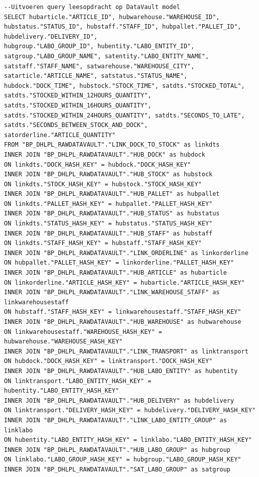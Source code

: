 \begin{lstlisting}[frame=single]
--Uitvoeren query leesopdracht op DataVault model
SELECT hubarticle."ARTICLE_ID", hubwarehouse."WAREHOUSE_ID", hubstatus."STATUS_ID", hubstaff."STAFF_ID", hubpallet."PALLET_ID", hubdelivery."DELIVERY_ID",
hubgroup."LABO_GROUP_ID", hubentity."LABO_ENTITY_ID", satgroup."LABO_GROUP_NAME", satentity."LABO_ENTITY_NAME", satstaff."STAFF_NAME", satwarehouse."WAREHOUSE_CITY",
satarticle."ARTICLE_NAME", satstatus."STATUS_NAME", hubdock."DOCK_TIME", hubstock."STOCK_TIME", satdts."STOCKED_TOTAL", satdts."STOCKED_WITHIN_12HOURS_QUANTITY",
satdts."STOCKED_WITHIN_16HOURS_QUANTITY", satdts."STOCKED_WITHIN_24HOURS_QUANTITY", satdts."SECONDS_TO_LATE", satdts."SECONDS_BETWEEN_STOCK_AND_DOCK", satorderline."ARTICLE_QUANTITY"
FROM "BP_DHLPL_RAWDATAVAULT"."LINK_DOCK_TO_STOCK" as linkdts
INNER JOIN "BP_DHLPL_RAWDATAVAULT"."HUB_DOCK" as hubdock
ON linkdts."DOCK_HASH_KEY" = hubdock."DOCK_HASH_KEY"
INNER JOIN "BP_DHLPL_RAWDATAVAULT"."HUB_STOCK" as hubstock
ON linkdts."STOCK_HASH_KEY" = hubstock."STOCK_HASH_KEY"
INNER JOIN "BP_DHLPL_RAWDATAVAULT"."HUB_PALLET" as hubpallet
ON linkdts."PALLET_HASH_KEY" = hubpallet."PALLET_HASH_KEY"
INNER JOIN "BP_DHLPL_RAWDATAVAULT"."HUB_STATUS" as hubstatus
ON linkdts."STATUS_HASH_KEY" = hubstatus."STATUS_HASH_KEY"
INNER JOIN "BP_DHLPL_RAWDATAVAULT"."HUB_STAFF" as hubstaff
ON linkdts."STAFF_HASH_KEY" = hubstaff."STAFF_HASH_KEY"
INNER JOIN "BP_DHLPL_RAWDATAVAULT"."LINK_ORDERLINE" as linkorderline
ON hubpallet."PALLET_HASH_KEY" = linkorderline."PALLET_HASH_KEY"
INNER JOIN "BP_DHLPL_RAWDATAVAULT"."HUB_ARTICLE" as hubarticle
ON linkorderline."ARTICLE_HASH_KEY" = hubarticle."ARTICLE_HASH_KEY"
INNER JOIN "BP_DHLPL_RAWDATAVAULT"."LINK_WAREHOUSE_STAFF" as linkwarehousestaff
ON hubstaff."STAFF_HASH_KEY" = linkwarehousestaff."STAFF_HASH_KEY"
INNER JOIN "BP_DHLPL_RAWDATAVAULT"."HUB_WAREHOUSE" as hubwarehouse
ON linkwarehousestaff."WAREHOUSE_HASH_KEY" = hubwarehouse."WAREHOUSE_HASH_KEY"
INNER JOIN "BP_DHLPL_RAWDATAVAULT"."LINK_TRANSPORT" as linktransport
ON hubdock."DOCK_HASH_KEY" = linktransport."DOCK_HASH_KEY"
INNER JOIN "BP_DHLPL_RAWDATAVAULT"."HUB_LABO_ENTITY" as hubentity
ON linktransport."LABO_ENTITY_HASH_KEY" = hubentity."LABO_ENTITY_HASH_KEY"
INNER JOIN "BP_DHLPL_RAWDATAVAULT"."HUB_DELIVERY" as hubdelivery
ON linktransport."DELIVERY_HASH_KEY" = hubdelivery."DELIVERY_HASH_KEY"
INNER JOIN "BP_DHLPL_RAWDATAVAULT"."LINK_LABO_ENTITY_GROUP" as linklabo
ON hubentity."LABO_ENTITY_HASH_KEY" = linklabo."LABO_ENTITY_HASH_KEY"
INNER JOIN "BP_DHLPL_RAWDATAVAULT"."HUB_LABO_GROUP" as hubgroup
ON linklabo."LABO_GROUP_HASH_KEY" = hubgroup."LABO_GROUP_HASH_KEY"
INNER JOIN "BP_DHLPL_RAWDATAVAULT"."SAT_LABO_GROUP" as satgroup

\end{lstlisting}
